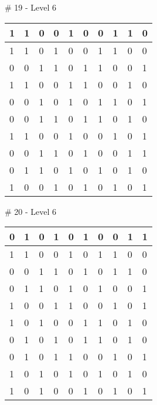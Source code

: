 \smallskip

\# 19 - Level 6 \newline
\begin{tabular}{|m{\collen}|m{\collen}|m{\collen}|m{\collen}|m{\collen}|m{\collen}|m{\collen}|m{\collen}|m{\collen}|m{\collen}|}
\hline
  1 & 1 & 0 & 0 & 1 & 0 & 0 & 1 & 1 & 0 \\
\hline
  1 & 1 & 0 & 1 & 0 & 0 & 1 & 1 & 0 & 0 \\
\hline
  0 & 0 & 1 & 1 & 0 & 1 & 1 & 0 & 0 & 1 \\
\hline
  1 & 1 & 0 & 0 & 1 & 1 & 0 & 0 & 1 & 0 \\
\hline
  0 & 0 & 1 & 0 & 1 & 0 & 1 & 1 & 0 & 1 \\
\hline
  0 & 0 & 1 & 1 & 0 & 1 & 1 & 0 & 1 & 0 \\
\hline
  1 & 1 & 0 & 0 & 1 & 0 & 0 & 1 & 0 & 1 \\
\hline
  0 & 0 & 1 & 1 & 0 & 1 & 0 & 0 & 1 & 1 \\
\hline
  0 & 1 & 1 & 0 & 1 & 0 & 1 & 0 & 1 & 0 \\
\hline
  1 & 0 & 0 & 1 & 0 & 1 & 0 & 1 & 0 & 1 \\
\hline
\end{tabular}


\smallskip

\# 20 - Level 6 \newline
\begin{tabular}{|m{\collen}|m{\collen}|m{\collen}|m{\collen}|m{\collen}|m{\collen}|m{\collen}|m{\collen}|m{\collen}|m{\collen}|}
\hline
  0 & 1 & 0 & 1 & 0 & 1 & 0 & 0 & 1 & 1 \\
\hline
  1 & 1 & 0 & 0 & 1 & 0 & 1 & 1 & 0 & 0 \\
\hline
  0 & 0 & 1 & 1 & 0 & 1 & 0 & 1 & 1 & 0 \\
\hline
  0 & 1 & 1 & 0 & 1 & 0 & 1 & 0 & 0 & 1 \\
\hline
  1 & 0 & 0 & 1 & 1 & 0 & 0 & 1 & 0 & 1 \\
\hline
  1 & 0 & 1 & 0 & 0 & 1 & 1 & 0 & 1 & 0 \\
\hline
  0 & 1 & 0 & 1 & 0 & 1 & 1 & 0 & 1 & 0 \\
\hline
  0 & 1 & 0 & 1 & 1 & 0 & 0 & 1 & 0 & 1 \\
\hline
  1 & 0 & 1 & 0 & 1 & 0 & 1 & 0 & 1 & 0 \\
\hline
  1 & 0 & 1 & 0 & 0 & 1 & 0 & 1 & 0 & 1 \\
\hline
\end{tabular}


\smallskip

